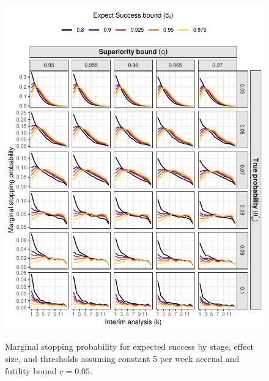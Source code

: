 \documentclass{article}
\begin{document}
\begin{figure}[!ht]
	\caption{Marginal stopping probability for expected success by stage, effect size, and thresholds assuming constant 5 per week accrual and futility bound $\underline{c}=0.05$.}
	\includegraphics{figures/stop_expect_success_5.pdf}
	\label{fig:stop_expect_success_5}
\end{figure}
\end{document}
